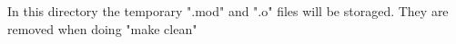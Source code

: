 In this directory the temporary ".mod" and ".o" files will be storaged. They are removed when doing "make clean"
